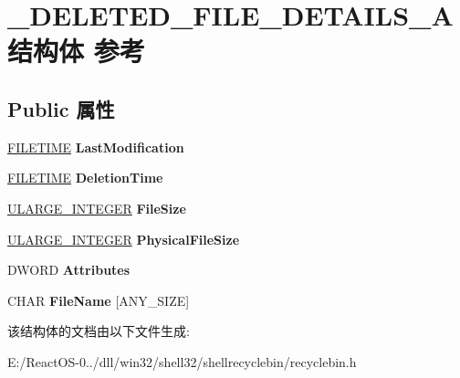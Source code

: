 \hypertarget{struct___d_e_l_e_t_e_d___f_i_l_e___d_e_t_a_i_l_s___a}{}\section{\+\_\+\+D\+E\+L\+E\+T\+E\+D\+\_\+\+F\+I\+L\+E\+\_\+\+D\+E\+T\+A\+I\+L\+S\+\_\+\+A结构体 参考}
\label{struct___d_e_l_e_t_e_d___f_i_l_e___d_e_t_a_i_l_s___a}
\subsection*{Public 属性}
\begin{DoxyCompactItemize}
\item 
\mbox{\label{struct___d_e_l_e_t_e_d___f_i_l_e___d_e_t_a_i_l_s___a_a12dc5463b908e24fb6321e6d9d71b401}} 
\hyperlink{struct___f_i_l_e_t_i_m_e}{F\+I\+L\+E\+T\+I\+ME} {\bfseries Last\+Modification}
\item 
\mbox{\label{struct___d_e_l_e_t_e_d___f_i_l_e___d_e_t_a_i_l_s___a_a26bf38a9feff42be83e392b6ccf1f524}} 
\hyperlink{struct___f_i_l_e_t_i_m_e}{F\+I\+L\+E\+T\+I\+ME} {\bfseries Deletion\+Time}
\item 
\mbox{\label{struct___d_e_l_e_t_e_d___f_i_l_e___d_e_t_a_i_l_s___a_a9cdf55aaf4788143c82acf2575186f3e}} 
\hyperlink{struct___u_l_a_r_g_e___i_n_t_e_g_e_r}{U\+L\+A\+R\+G\+E\+\_\+\+I\+N\+T\+E\+G\+ER} {\bfseries File\+Size}
\item 
\mbox{\label{struct___d_e_l_e_t_e_d___f_i_l_e___d_e_t_a_i_l_s___a_ac9dbf249bfa2d1049b262714066120fd}} 
\hyperlink{struct___u_l_a_r_g_e___i_n_t_e_g_e_r}{U\+L\+A\+R\+G\+E\+\_\+\+I\+N\+T\+E\+G\+ER} {\bfseries Physical\+File\+Size}
\item 
\mbox{\label{struct___d_e_l_e_t_e_d___f_i_l_e___d_e_t_a_i_l_s___a_acb8ba973f932208269f6d3ad72a83551}} 
D\+W\+O\+RD {\bfseries Attributes}
\item 
\mbox{\label{struct___d_e_l_e_t_e_d___f_i_l_e___d_e_t_a_i_l_s___a_ab0afabeaf709a962338b3be050640c0a}} 
C\+H\+AR {\bfseries File\+Name} \mbox{[}A\+N\+Y\+\_\+\+S\+I\+ZE\mbox{]}
\end{DoxyCompactItemize}


该结构体的文档由以下文件生成\+:\begin{DoxyCompactItemize}
\item 
E\+:/\+React\+O\+S-\/0../dll/win32/shell32/shellrecyclebin/recyclebin.\+h\end{DoxyCompactItemize}
